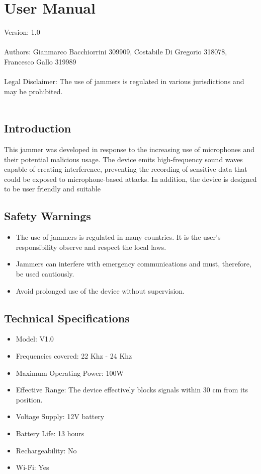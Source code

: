 \chapter{User Manual}
Version: 1.0\\\\
Authors: Gianmarco Bacchiorrini 309909, Costabile Di Gregorio 318078, Francesco Gallo
319989\\\\
Legal Disclaimer: The use of jammers is regulated in various jurisdictions and may be
prohibited.\\\\

\section{Introduction}
This jammer was developed in response to the increasing use of microphones and their
potential malicious usage. The device emits high-frequency sound waves capable of creating
interference, preventing the recording of sensitive data that could be exposed to
microphone-based attacks.
In addition, the device is designed to be user friendly and suitable 

\section{Safety Warnings}
\begin{itemize}
    \item The use of jammers is regulated in many countries. It is the user's responsibility observe
    and respect the local laws.
    \item Jammers can interfere with emergency communications and must, therefore, be used
    cautiously.
    \item Avoid prolonged use of the device without supervision.
\end{itemize}

\section{Technical Specifications}
\begin{itemize}
    \item Model: V1.0
    \item Frequencies covered: 22 Khz - 24 Khz
    \item Maximum Operating Power: 100W
    \item Effective Range: The device effectively blocks signals within 30 cm from its position.
    \item Voltage Supply: 12V battery
    \item Battery Life: 13 hours
    \item Rechargeability: No
    \item Wi-Fi: Yes
\end{itemize}

